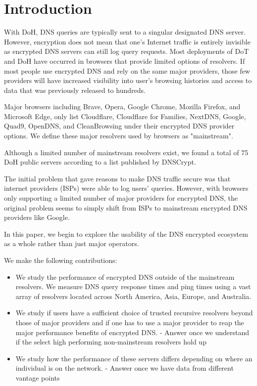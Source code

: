 \section{Introduction}\label{sec:intro}

With DoH, DNS queries are typically sent to a singular designated DNS server.
However, encryption does not mean that one's Internet traffic is entirely invisible as encrypted DNS servers can still log query requests.
Most deployments of DoT and DoH have occurred in browsers that provide limited options of resolvers.
If most people use encrypted DNS and rely on the same major providers, those few providers will have increased visibility into user's browsing histories and access to data that was previously released to hundreds. 

Major browsers including Brave, Opera, Google Chrome, Mozilla Firefox, and Microsoft Edge, only list Cloudflare, Cloudflare for Families, NextDNS, Google, Quad9, OpenDNS, and CleanBrowsing under their encrypted DNS provider options. We define these major resolvers used by browsers as "mainstream".

Although a limited number of mainstream resolvers exist, we found a total of 75 DoH public servers according to a list published by DNSCrypt.

The initial problem that gave reasons to make DNS traffic secure was that internet providers (ISPs) were able to log users' queries. 
However, with browsers only supporting a limited number of major providers for encrypted DNS, the original problem seems to simply shift from ISPs to mainstream encrypted DNS providers like Google. 

In this paper, we begin to explore the usability of the DNS encrypted ecosystem as a whole rather than just major operators. 

We make the following contributions:

\begin{itemize}
\setlength\itemsep{0em}
\item We study the performance of encrypted DNS outside of the mainstream resolvers. We measure DNS query response times and ping times using a vast array of resolvers located across North America, Asia, Europe, and Australia. 
\item We study if users have a sufficient choice of trusted recursive resolvers beyond those of major providers and if one has to use a major provider to reap the major performance benefits of encrypted DNS.
	- Answer once we understand if the select high performing non-mainstream resolvers hold up 
\item We study how the performance of these servers differs depending on where an individual is on the network.
	- Answer once we have data from different vantage points 

\end{itemize}
